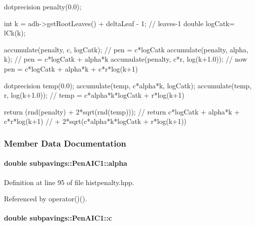 \begin{DoxyCode}
      {
          dotprecision penalty(0.0);
  
          int k = adh->getRootLeaves() + deltaLeaf - 1; // leaves-1
          double logCatk= lCk(k);
  
          accumulate(penalty, c, logCatk); // pen = c*logCatk
          accumulate(penalty, alpha, k); // pen = c*logCatk + alpha*k
          accumulate(penalty, c*r, log(k+1.0));
          // now pen = c*logCatk + alpha*k + c*r*log(k+1)
  
          dotprecision temp(0.0);
          accumulate(temp, c*alpha*k, logCatk);
          accumulate(temp, r, log(k+1.0));
          // temp = c*alpha*k*logCatk + r*log(k+1)
  
          return (rnd(penalty) + 2*sqrt(rnd(temp)));
          // return c*logCatk + alpha*k + c*r*log(k+1)
          //                          + 2*sqrt(c*alpha*k*logCatk + r*log(k+1))
      }
\end{DoxyCode}


\subsubsection{\-Member \-Data \-Documentation}
\hypertarget{classsubpavings_1_1PenAIC1_a6d32c74620d16440e5e6d91242bb9736}{
\paragraph[{alpha}]{\setlength{\rightskip}{0pt plus 5cm}double {\bf subpavings\-::\-Pen\-A\-I\-C1\-::alpha}}}\label{classsubpavings_1_1PenAIC1_a6d32c74620d16440e5e6d91242bb9736}


\-Definition at line 95 of file histpenalty.\-hpp.



\-Referenced by operator()().

\hypertarget{classsubpavings_1_1PenAIC1_a8ee2e73a1cb5a953cd3ec61376a46baf}{
\paragraph[{c}]{\setlength{\rightskip}{0pt plus 5cm}double {\bf subpavings\-::\-Pen\-A\-I\-C1\-::c}}}\label{classsubpavings_1_1PenAIC1_a8ee2e73a1cb5a953cd3ec61376a46baf}


